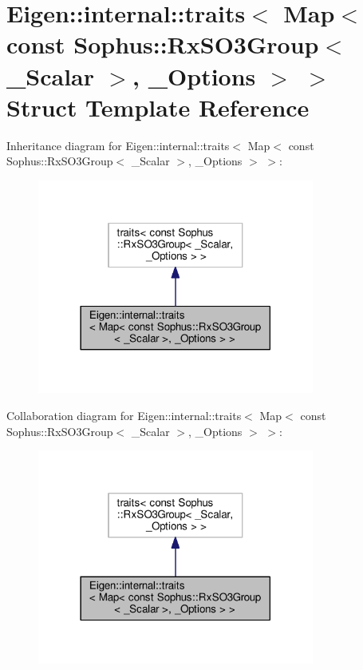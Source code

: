 \hypertarget{struct_eigen_1_1internal_1_1traits_3_01_map_3_01const_01_sophus_1_1_rx_s_o3_group_3_01___scalar_01_4_00_01___options_01_4_01_4}{}\section{Eigen\+:\+:internal\+:\+:traits$<$ Map$<$ const Sophus\+:\+:Rx\+S\+O3\+Group$<$ \+\_\+\+Scalar $>$, \+\_\+\+Options $>$ $>$ Struct Template Reference}
\label{struct_eigen_1_1internal_1_1traits_3_01_map_3_01const_01_sophus_1_1_rx_s_o3_group_3_01___scalar_01_4_00_01___options_01_4_01_4}


Inheritance diagram for Eigen\+:\+:internal\+:\+:traits$<$ Map$<$ const Sophus\+:\+:Rx\+S\+O3\+Group$<$ \+\_\+\+Scalar $>$, \+\_\+\+Options $>$ $>$\+:
\nopagebreak
\begin{figure}[H]
\begin{center}
\leavevmode
\includegraphics[width=258pt]{struct_eigen_1_1internal_1_1traits_3_01_map_3_01const_01_sophus_1_1_rx_s_o3_group_3_01___scalar_bc2b46e1e30a45ec4fb0b21e26a84111}
\end{center}
\end{figure}


Collaboration diagram for Eigen\+:\+:internal\+:\+:traits$<$ Map$<$ const Sophus\+:\+:Rx\+S\+O3\+Group$<$ \+\_\+\+Scalar $>$, \+\_\+\+Options $>$ $>$\+:
\nopagebreak
\begin{figure}[H]
\begin{center}
\leavevmode
\includegraphics[width=258pt]{struct_eigen_1_1internal_1_1traits_3_01_map_3_01const_01_sophus_1_1_rx_s_o3_group_3_01___scalar_f2f83d8169f5097e8cb7b00197aa71f3}
\end{center}
\end{figure}
